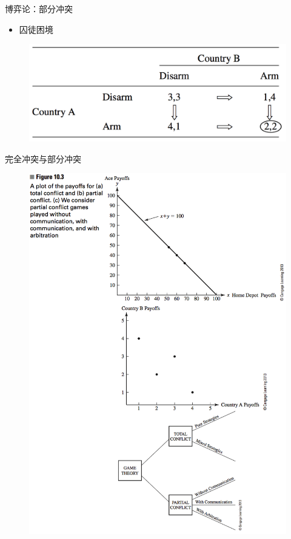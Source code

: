 \documentclass[UTF8]{ctexbeamer}
\begin{document}
\begin{frame}{博弈论：部分冲突}

  \begin{itemize}
  \item 囚徒困境
  \end{itemize}

  \begin{figure}
    \includegraphics[width=0.8\textwidth{}]{country.png}
  \end{figure}
  
\end{frame}

\begin{frame}{完全冲突与部分冲突}
  
  \begin{figure}
    \includegraphics[height=0.8\textheight{}]{game.png}
  \end{figure}

\end{frame}
\end{document}

